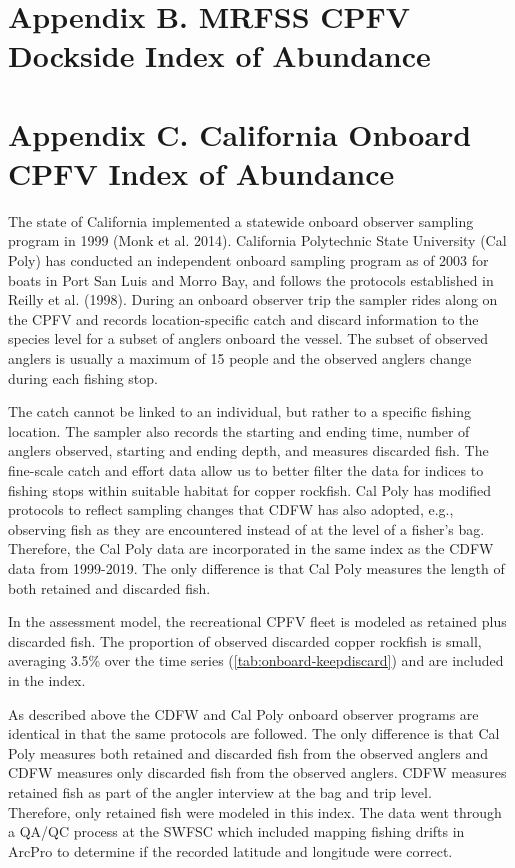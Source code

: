 \documentclass[11pt,
  english,
  letterpaper,
]{article}
\begin{document}
\pagebreak

\hypertarget{mrfss-cpfv-index}{%
\section{Appendix B. MRFSS CPFV Dockside Index of Abundance}\label{mrfss-cpfv-index}}

\hypertarget{onboard-cpfv-index}{%
\section{Appendix C. California Onboard CPFV Index of Abundance}\label{onboard-cpfv-index}}

The state of California implemented a statewide onboard observer sampling program in 1999 (Monk et al. 2014). California Polytechnic State University (Cal Poly) has conducted an independent onboard sampling program as of 2003 for boats in Port San Luis and Morro Bay, and follows the protocols established in Reilly et al. (1998). During an onboard observer trip the sampler rides along on the CPFV and records location-specific catch and discard information to the species level for a subset of anglers onboard the vessel. The subset of observed anglers is usually a maximum of 15 people and the observed anglers change during each fishing stop.

The catch cannot be linked to an individual, but rather to a specific fishing location. The sampler also records the starting and ending time, number of anglers observed, starting and ending depth, and measures discarded fish. The fine-scale catch and effort data allow us to better filter the data for indices to fishing stops within suitable habitat for copper rockfish. Cal Poly has modified protocols to reflect sampling changes that CDFW has also adopted, e.g., observing fish as they are encountered instead of at the level of a fisher's bag. Therefore, the Cal Poly data are incorporated in the same index as the CDFW data from 1999-2019. The only difference is that Cal Poly measures the length of both retained and discarded fish.

In the assessment model, the recreational CPFV fleet is modeled as retained plus discarded fish. The proportion of observed discarded copper rockfish is small, averaging 3.5\% over the time series (\ref{tab:onboard-keepdiscard}) and are included in the index.

As described above the CDFW and Cal Poly onboard observer programs are identical in that the same protocols are followed. The only difference is that Cal Poly measures both retained and discarded fish from the observed anglers and CDFW measures only discarded fish from the observed anglers. CDFW measures retained fish as part of the angler interview at the bag and trip level.\\
Therefore, only retained fish were modeled in this index. The data went through a QA/QC process at the SWFSC which included mapping fishing drifts in ArcPro to determine if the recorded latitude and longitude were correct.
\end{document}
